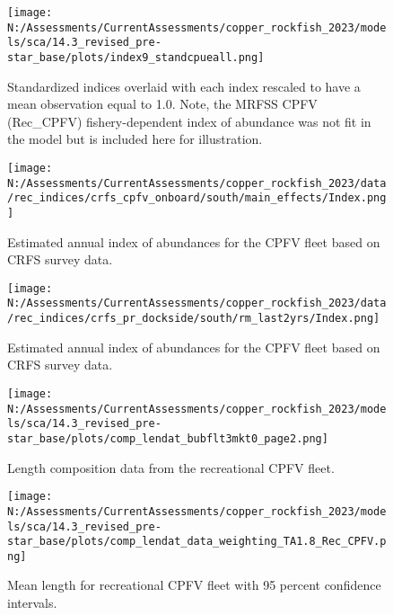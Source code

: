 \documentclass[11pt,
  english,
  letterpaper,
]{article}
\begin{document}
\pagebreak

\begin{figure}
\centering
\texttt{[image: N:/Assessments/CurrentAssessments/copper\_rockfish\_2023/models/sca/14.3\_revised\_pre-star\_base/plots/index9\_standcpueall.png]}
\caption{Standardized indices overlaid with each index rescaled to have a mean observation equal to 1.0. Note, the MRFSS CPFV (Rec\_CPFV) fishery-dependent index of abundance was not fit in the model but is included here for illustration.\label{fig:stand-cpue}}
\end{figure}

\pagebreak

\begin{figure}
\centering
\texttt{[image: N:/Assessments/CurrentAssessments/copper\_rockfish\_2023/data/rec\_indices/crfs\_cpfv\_onboard/south/main\_effects/Index.png]}
\caption{Estimated annual index of abundances for the CPFV fleet based on CRFS survey data.\label{fig:crfs-index-main}}
\end{figure}

\pagebreak

\begin{figure}
\centering
\texttt{[image: N:/Assessments/CurrentAssessments/copper\_rockfish\_2023/data/rec\_indices/crfs\_pr\_dockside/south/rm\_last2yrs/Index.png]}
\caption{Estimated annual index of abundances for the CPFV fleet based on CRFS survey data.\label{fig:crfs-pr-index-main}}
\end{figure}

\pagebreak

\begin{figure}
\centering
\texttt{[image: N:/Assessments/CurrentAssessments/copper\_rockfish\_2023/models/sca/14.3\_revised\_pre-star\_base/plots/comp\_lendat\_bubflt3mkt0\_page2.png]}
\caption{Length composition data from the recreational CPFV fleet.\label{fig:rec-cpfv-len-data}}
\end{figure}

\pagebreak

\begin{figure}
\centering
\texttt{[image: N:/Assessments/CurrentAssessments/copper\_rockfish\_2023/models/sca/14.3\_revised\_pre-star\_base/plots/comp\_lendat\_data\_weighting\_TA1.8\_Rec\_CPFV.png]}
\caption{Mean length for recreational CPFV fleet with 95 percent confidence intervals.\label{fig:mean-rec-cpfv-len-data}}
\end{figure}
\end{document}
